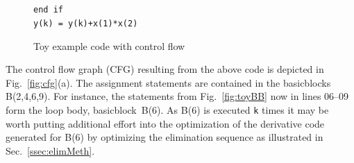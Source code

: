 \documentclass[11pt]{article}
\newcommand{\basicblock}{basicblock}
\newcommand{\refsec}[1]{{Sec.~\ref{#1}}}
\newcommand{\reffig}[1]{{Fig.~\ref{#1}}}
\begin{document}
\begin{figure}
\begin{center}
\begin{minipage}{.5\textwidth}
\begin{tabbing}
\hspace{.6cm}{\footnotesize \bf 09}\hspace{.5cm} \> \\
\hspace{.6cm}{\footnotesize \bf 10}\hspace{.5cm}  \\
\hspace{.6cm}{\footnotesize \bf 11}\hspace{.5cm} {\tt end if } \\
\hspace{.6cm}{\footnotesize \bf 12}\hspace{.5cm} {\tt y(k) = y(k)+x(1)*x(2) } 
\end{tabbing}
\end{minipage}
\end{center}
\caption{Toy example code with control flow}\label{fig:toy}
\end{figure}
The control flow graph (CFG) \cite{ASU86} resulting from the above code is depicted in 
\reffig{fig:cfg}(a).
The assignment statements are contained in the {\basicblock}s B(2,4,6,9).
For instance, 
the statements from \reffig{fig:toyBB} now  in lines 06--09 form the loop body, \basicblock\ B(6).
As B(6) is executed
{\tt k} times it may be worth putting
additional effort into the optimization of the derivative code 
generated for B(6) by optimizing the elimination sequence as illustrated in 
\refsec{ssec:elimMeth}.
\end{document}

